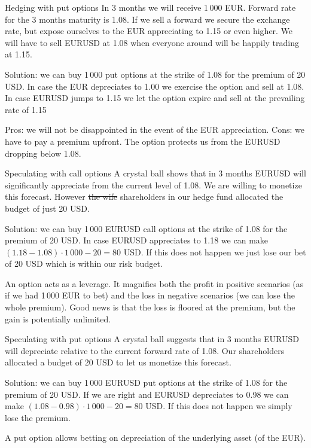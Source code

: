 \documentclass{beamer}
\begin{document}
\begin{frame}{Hedging with put options}
\justify
In 3 months we will receive 1\,000 EUR. Forward rate for the 3 months maturity is 1.08. If we sell a forward we secure the exchange rate, but expose ourselves to the EUR appreciating to 1.15 or even higher. We will have to sell EURUSD at 1.08 when everyone around will be happily trading at 1.15.

\justify
Solution: we can buy 1\,000 put options at the strike of 1.08 for the premium of 20 USD. In case the EUR depreciates to 1.00 we exercise the option and sell at 1.08. In case EURUSD jumps to 1.15 we let the option expire and sell at the prevailing rate of 1.15

\justify
Pros: we will not be disappointed in the event of the EUR appreciation. Cons: we have to pay a premium upfront. The option protects us from the EURUSD dropping below 1.08.
\end{frame}



\begin{frame}{Speculating with call options}
\justify
A crystal ball shows that in 3 months EURUSD will significantly \alert{appreciate} from the current level of 1.08. We are willing to monetize this forecast. However \sout{the wife} shareholders in our hedge fund allocated the budget of just 20 USD.

\justify
Solution: we can buy 1\,000 EURUSD \alert{call} options at the strike of 1.08 for the premium of 20 USD. In case EURUSD appreciates to 1.18 we can make $(1.18 - 1.08) \cdot 1\,000 - 20 = 80$ USD. If this does not happen we just lose our bet of 20 USD which is within our risk budget.

\justify
An option acts as a leverage. It magnifies both the profit in positive scenarios (as if we had 1\,000 EUR to bet) and the loss in negative scenarios (we can lose the whole premium). Good news is that the loss is floored at the premium, but the gain is potentially unlimited.
\end{frame}



\begin{frame}{Speculating with put options}
\justify
A crystal ball suggests that in 3 months EURUSD will \alert{depreciate} relative to the current forward rate of 1.08. Our shareholders allocated a budget of 20 USD to let us monetize this forecast.

\justify
Solution: we can buy 1\,000 EURUSD \alert{put} options at the strike of 1.08 for the premium of 20 USD. If we are right and EURUSD depreciates to 0.98 we can make $(1.08 - 0.98)\cdot1\,000 - 20 = 80$ USD. If this does not happen we simply lose the premium.

\justify
A put option allows betting on depreciation of the underlying asset (of the EUR).
\end{frame}
\end{document}
